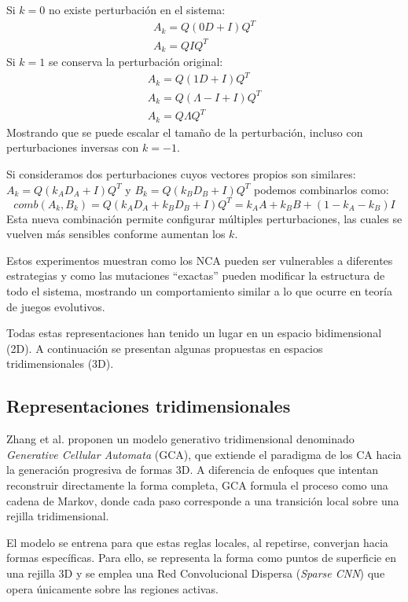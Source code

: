 Si $k = 0$ no existe perturbación en el sistema:
\begin{gather*}
	A_k = Q(0D + I)Q^T \\
	A_k = Q I Q^T
\end{gather*}
Si $k = 1$ se conserva la perturbación original:
\begin{gather*}
	A_k = Q(1D + I)Q^T \\
	A_k = Q(\Lambda - I + I)Q^T \\
	A_k = Q \Lambda Q^T
\end{gather*}
Mostrando que se puede escalar el tamaño de la perturbación, incluso con perturbaciones inversas con $k = -1$.

Si consideramos dos perturbaciones cuyos vectores propios son similares: $A_k = Q(k_AD_A + I)Q^T$ y $B_k = Q(k_B D_B + I)Q^T$ podemos combinarlos como:
\[ comb(A_k, B_k) = Q (k_A D_A + k_B D_B + I) Q^T = k_A A + k_B B + (1 - k_A - k_B) I \]
Esta nueva combinación permite configurar múltiples perturbaciones, las cuales se vuelven más sensibles conforme aumentan los $k$.

Estos experimentos muestran como los NCA pueden ser vulnerables a diferentes estrategias y como las mutaciones ``exactas'' pueden modificar la estructura de todo el sistema, mostrando un comportamiento similar a lo que ocurre en teoría de juegos evolutivos.

Todas estas representaciones han tenido un lugar en un espacio bidimensional (2D). A continuación se presentan algunas propuestas en espacios tridimensionales (3D). 

\subsection{Representaciones tridimensionales}

Zhang et al. \cite{GCA} proponen un modelo generativo tridimensional denominado \textit{Generative Cellular Automata} (GCA), que extiende el paradigma de los CA hacia la generación progresiva de formas 3D. A diferencia de enfoques que intentan reconstruir directamente la forma completa, GCA formula el proceso como una cadena de Markov, donde cada paso corresponde a una transición local sobre una rejilla tridimensional. 

El modelo se entrena para que estas reglas locales, al repetirse, converjan hacia formas específicas. Para ello, se representa la forma como puntos de superficie en una rejilla 3D y se emplea una Red Convolucional Dispersa (\textit{Sparse CNN}) que opera únicamente sobre las regiones activas.


